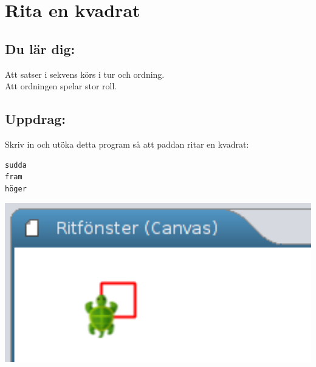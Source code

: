 \chapter{Rita en kvadrat}
\begin{multicols}{2}
\section*{\color{MidnightBlue}Du lär dig:}
Att satser i sekvens körs i tur och ordning.\\
Att ordningen spelar stor roll.
\section*{\color{MidnightBlue}Uppdrag:}
Skriv in och utöka detta program så att paddan ritar en kvadrat:

\begin{lstlisting}[basicstyle={\ttfamily\fontsize{24}{24}\selectfont}]
sudda
fram
höger
\end{lstlisting}
        

\columnbreak

\includegraphics[width=14cm]{../img/kvadrat.png}
\end{multicols}

